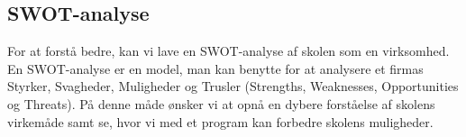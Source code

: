 \subsection{SWOT-analyse}
For at forstå \school bedre, kan vi lave en SWOT-analyse af skolen som en virksomhed. En SWOT-analyse er en model, man kan benytte for at analysere et firmas Styrker, Svagheder, Muligheder og Trusler (Strengths, Weaknesses, Opportunities og Threats). På denne måde ønsker vi at opnå en dybere forståelse af skolens virkemåde samt se, hvor vi med et program kan forbedre skolens muligheder.
\begin{table}[!h]
	\centering
\end{table}
